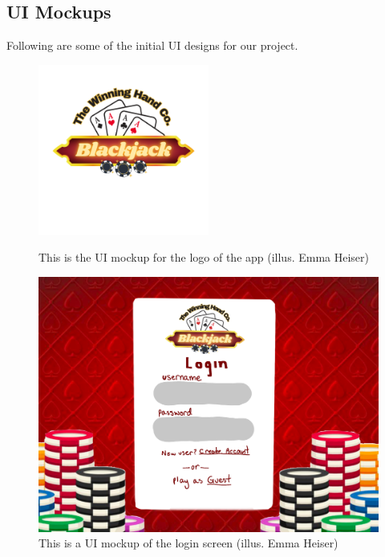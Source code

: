 \pagebreak

\subsection{UI Mockups}
Following are some of the initial UI designs for our project.

\begin{figure}[H]
    \centering
    \includegraphics[width=0.5\textwidth]{figures/Blackjack.png} \\
    \caption{This is the UI mockup for the logo of the app (illus. Emma Heiser)}
    \label{fig:logo}
\end{figure}

\begin{figure}[H]
    \centering
    \includegraphics[width=0.75\linewidth]{figures/login.png}
    \caption{This is a UI mockup of the login screen (illus. Emma Heiser)}
    \label{fig:login}
\end{figure}

